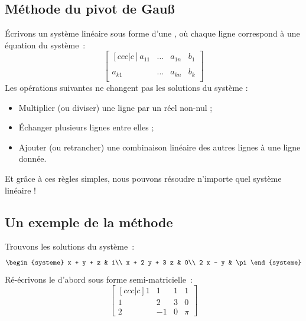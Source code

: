 \subsection{Méthode du pivot de Gau\ss}
\begin{frame}
Écrivons un système linéaire sous forme d'une , où chaque ligne correspond à une équation du système~:\pause{}
\begin{equation*}
  \begin{bmatrix}[ccc|c]
    a_{11} &\ldots& a_{1n} & b_{1}\\
    & & & \\
    a_{k1} &\ldots& a_{kn} & b_{k}\\
  \end{bmatrix}
\end{equation*}\pause{}
Les opérations suivantes ne changent pas les solutions du système :\pause{}
\begin{itemize}[<+->]
\item Multiplier (ou diviser) une ligne par un réel non-nul ;
\item Échanger plusieurs lignes entre elles ;
\item Ajouter (ou retrancher) une combinaison linéaire des autres lignes à une ligne donnée.
\end{itemize}\pause{}
Et grâce à ces règles simples, nous pouvons résoudre n'importe quel système linéaire !
\end{frame}

\subsection{Un exemple de la méthode}
\label{sec:un-exemple-concret}
\begin{frame}
Trouvons les solutions du système~:
\begin{equation*}
  \begin{systeme}
    x + y + z & 1\\
    x + 2 y + 3 z & 0\\
    2 x - y & \pi
  \end{systeme}
\end{equation*}\pause{}
Ré-écrivons le d'abord sous forme semi-matricielle~:\pause{}
\begin{equation*}
  \begin{bmatrix}[ccc|c]
    1 & 1 & 1 & 1\\
    1 & 2 & 3 & 0\\
    2 &-1 & 0 & \pi
  \end{bmatrix}
\end{equation*}
\end{frame}

